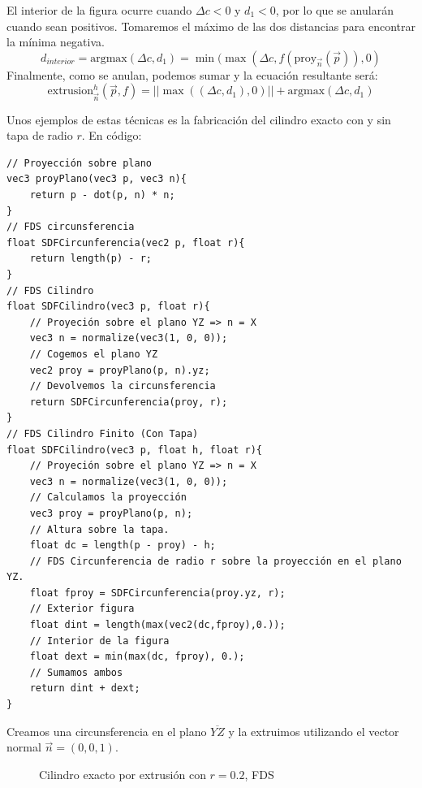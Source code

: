 El interior de la figura ocurre cuando \(\Delta c < 0\) y \(d_1 < 0\), por lo que se anularán cuando sean positivos. Tomaremos el máximo de las dos distancias para encontrar la mínima negativa.
\[d_{interior} = \text{argmax}(\Delta c, d_1) = \min(\max(\Delta c, f(\text{proy}_{\Vec{n}}(\Vec{p})), 0)\]
Finalmente, como se anulan, podemos sumar y la ecuación resultante será:
\[\text{extrusion}^h_{\Vec{n}}\left(\Vec{p},f\right)=\vert\vert \max((\Delta c, d_1), 0)\vert\vert +  \text{argmax}(\Delta c, d_1) \]

Unos ejemplos de estas técnicas es la fabricación del cilindro exacto con y sin tapa de radio \(r\). En código:
\begin{lstlisting}
// Proyección sobre plano
vec3 proyPlano(vec3 p, vec3 n){
    return p - dot(p, n) * n;
}
// FDS circunsferencia
float SDFCircunferencia(vec2 p, float r){
	return length(p) - r;
}
// FDS Cilindro
float SDFCilindro(vec3 p, float r){
    // Proyeción sobre el plano YZ => n = X
    vec3 n = normalize(vec3(1, 0, 0));
    // Cogemos el plano YZ
    vec2 proy = proyPlano(p, n).yz;
    // Devolvemos la circunsferencia
    return SDFCircunferencia(proy, r);
}
// FDS Cilindro Finito (Con Tapa)
float SDFCilindro(vec3 p, float h, float r){
    // Proyeción sobre el plano YZ => n = X
    vec3 n = normalize(vec3(1, 0, 0));
    // Calculamos la proyección
    vec3 proy = proyPlano(p, n);
    // Altura sobre la tapa.
    float dc = length(p - proy) - h;
    // FDS Circunferencia de radio r sobre la proyección en el plano YZ.
    float fproy = SDFCircunferencia(proy.yz, r);
    // Exterior figura
    float dint = length(max(vec2(dc,fproy),0.));
    // Interior de la figura
    float dext = min(max(dc, fproy), 0.);
    // Sumamos ambos
    return dint + dext;
}
\end{lstlisting}

Creamos una circunsferencia en el plano \(\overline{YZ}\) y la extruimos utilizando el vector normal \(\Vec{n}=(0,0,1)\).

\begin{figure}[H]
  \centering
  \captionsetup{justification=centering}%
  \hfill
  \caption{Cilindro exacto por extrusión con \(r=0.2\), FDS}
\end{figure}

